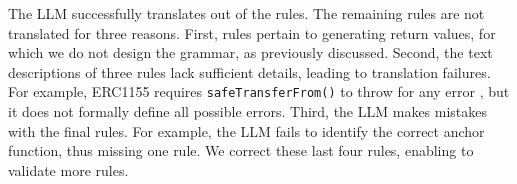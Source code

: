
The LLM successfully translates  out of the  rules. 
The remaining  rules are not translated for three reasons.
First,  rules pertain to generating return values, 
for which we do not design the grammar, as previously discussed.
 
Second, the text descriptions of three rules lack sufficient details, leading to translation failures. 
For example, ERC1155 requires \texttt{safeTransferFrom()} to throw for any error , 
but it does not formally define all possible errors.
Third, the LLM makes mistakes with the final  rules. For example, the LLM fails to identify
the correct anchor function, thus missing one rule. 
%
We correct these last four rules, enabling \Tool{} to validate more rules. 

\fi





